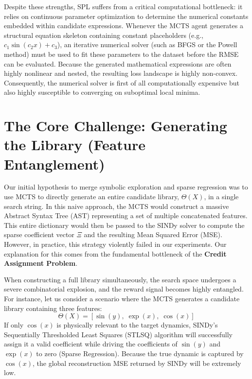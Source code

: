 \documentclass[11pt, a4paper]{article}
\begin{document}
Despite these strengths, SPL suffers from a critical computational bottleneck: it relies on continuous parameter optimization to determine the numerical constants embedded within candidate expressions. Whenever the MCTS agent generates a structural equation skeleton containing constant placeholders (e.g., $c_1 \sin(c_2 x) + c_3$), an iterative numerical solver (such as BFGS or the Powell method) must be used to fit these parameters to the dataset before the RMSE can be evaluated. Because the generated mathematical expressions are often highly nonlinear and nested, the resulting loss landscape is highly non-convex. Consequently, the numerical solver is first of all computationally expensive but also highly susceptible to converging on suboptimal local minima. 

\section{The Core Challenge: Generating the Library (Feature Entanglement)}

Our initial hypothesis to merge symbolic exploration and sparse regression was to use MCTS to directly generate an entire candidate library, $\Theta(X)$, in a single search string. In this naive approach, the MCTS would construct a massive Abstract Syntax Tree (AST) representing a set of multiple concatenated features. This entire dictionary would then be passed to the SINDy solver to compute the sparse coefficient vector $\Xi$ and the resulting Mean Squared Error (MSE). However, in practice, this strategy violently failed in our experiments. Our explanation for this comes from the fundamental bottleneck of the \textbf{Credit Assignment Problem}. 

When constructing a full library simultaneously, the search space undergoes a severe combinatorial explosion, and the reward signal becomes highly entangled. For instance, let us consider a scenario where the MCTS generates a candidate library containing three features:
\begin{equation}
    \Theta(X) = [\sin(y), \; \exp(x), \; \cos(x)]
\end{equation}
If only $\cos(x)$ is physically relevant to the target dynamics, SINDy's Sequentially Thresholded Least Squares (STLSQ) algorithm will successfully assign it a valid coefficient while driving the coefficients of $\sin(y)$ and $\exp(x)$ to zero (Sparse Regression). Because the true dynamic is captured by $\cos(x)$, the global reconstruction MSE returned by SINDy will be extremely low.
\end{document}
